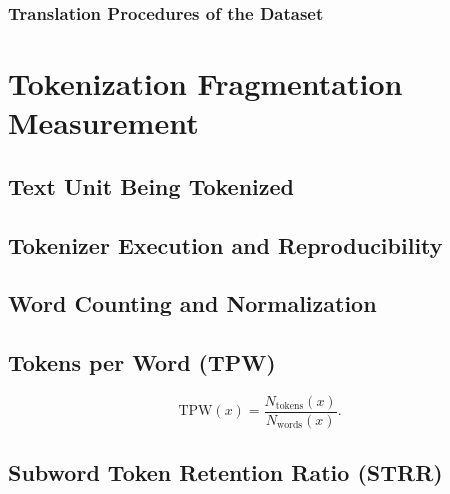\documentclass[runningheads]{llncs}
\begin{document}
\subsubsection{Translation Procedures of the Dataset}

\section{Tokenization Fragmentation Measurement}

\subsection{Text Unit Being Tokenized}

\subsection{Tokenizer Execution and Reproducibility}

\subsection{Word Counting and Normalization}

\subsection{Tokens per Word (TPW)}
\begin{equation}
	\mathrm{TPW}(x) =
	\frac{N_{\mathrm{tokens}}(x)}
	{N_{\mathrm{words}}(x)}.
	\label{eq:tpw}
\end{equation}

\subsection{Subword Token Retention Ratio (STRR)}
\end{document}
